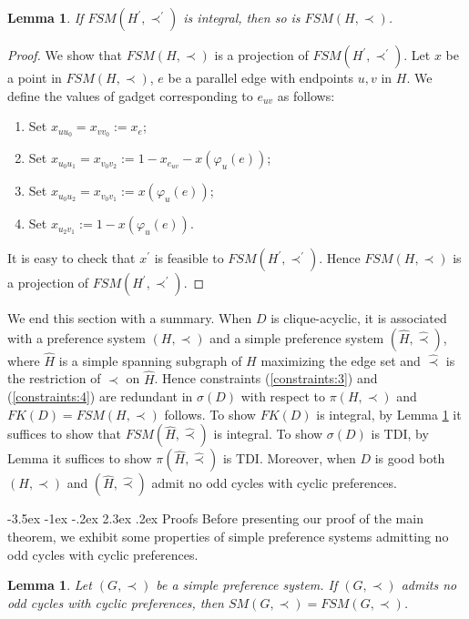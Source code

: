 \documentclass[11pt]{article}
\makeatletter
\newtheorem{lemma}[theorem]{Lemma}
\numberwithin{theorem}{section}
\renewcommand\section{%
  \@startsection{section}{1}
                {\z@}%
                {-3.5ex \@plus -1ex \@minus -.2ex}%
                {2.3ex \@plus.2ex}%
                {\large\bfseries}%
}
\makeatother
\begin{document}
\begin{lemma}
\label{lem:reduct4}
If $FSM(H^\prime,\prec^\prime)$ is integral, then so is $FSM(H,\prec)$.
\end{lemma}
\begin{proof}
We show that $FSM(H,\prec)$ is a projection of $FSM(H^\prime,\prec^\prime)$.
Let $x$ be a point in $FSM(H,\prec)$, $e$ be a parallel edge with endpoints $u,v$ in $H$.
We define the values of gadget corresponding to $e_{uv}$ as follows:
\begin{enumerate}
  \item Set $x_{u u_0}=x_{v v_0}:=x_{e}$;
  \item Set $x_{u_0 u_1}=x_{v_0 v_2}:=1-x_{e_{uv}}-x(\varphi_u(e))$;
  \item Set $x_{u_0 u_2}=x_{v_0 v_1}:=x(\varphi_u (e))$;
  \item Set $x_{u_2 v_1}:=1-x(\varphi_u (e))$.
\end{enumerate}
It is easy to check that $x^\prime$ is feasible to $FSM(H^\prime, \prec^\prime)$.
Hence $FSM(H,\prec)$ is a projection of $FSM(H^\prime,\prec^\prime)$.
\end{proof}

We end this section with a summary. When $D$ is clique-acyclic, it is associated with a preference system $(H,\prec)$ and a simple preference system $(\hat{H},\hat\prec)$, where $\hat{H}$ is a simple spanning subgraph of $H$ maximizing the edge set and $\hat\prec$ is the restriction of $\prec$ on $\hat{H}$.
Hence constraints (\ref{constraints:3}) and (\ref{constraints:4}) are redundant in $\sigma(D)$ with respect to $\pi(H,\prec)$ and $FK(D)=FSM(H,\prec)$ follows. To show $FK(D)$ is integral, by Lemma \ref{lem:reduct4} it suffices to show that $FSM(\hat{H},\hat\prec)$ is integral. To show $\sigma(D)$ is TDI, by Lemma it suffices to show $\pi(\hat{H},\hat\prec)$ is TDI. Moreover, when $D$ is good both $(H,\prec)$ and $(\hat{H},\hat\prec)$ admit no odd cycles with cyclic preferences.

\section{Proofs}
Before presenting our proof of the main theorem, we exhibit some properties of simple preference systems admitting no odd cycles with cyclic preferences.
\begin{lemma}
\label{lem:prf1}
Let $(G,\prec)$ be a simple preference system. If $(G,\prec)$ admits no odd cycles with cyclic preferences, then $SM(G,\prec)=FSM(G,\prec)$.
\end{lemma}
\end{document}
